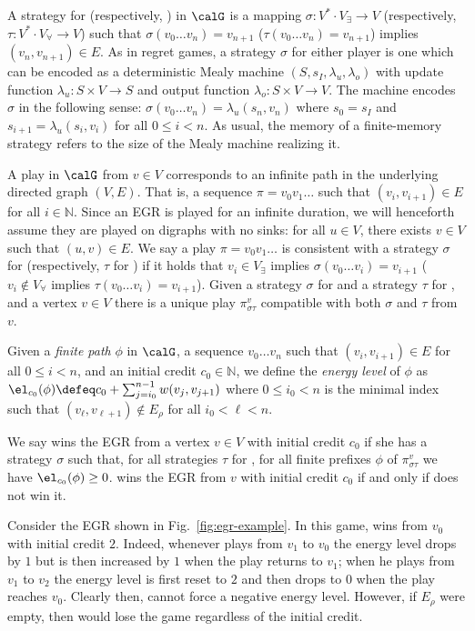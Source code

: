 \documentclass[a4paper]{article}
\begin{document}
A strategy for \eve (respectively, \adam) in $\calG$ is a mapping $\sigma :
V^* \cdot V_\exists \to V$ (respectively, $\tau : V^* \cdot V_\forall \to V$)
such that $\sigma(v_0 \dots v_n) = v_{n+1}$ ($\tau(v_0 \dots v_n) = v_{n+1}$)
implies $(v_n, v_{n+1}) \in E$. As in regret games, a strategy $\sigma$ for
either player is one which can be encoded as a deterministic Mealy machine
$(S,s_I,\lambda_u,\lambda_o)$ with update function $\lambda_u : S \times V \to S$
and output function $\lambda_o : S \times V \to V$. The machine encodes $\sigma$
in the following sense: $\sigma(v_0 \dots v_n) = \lambda_u(s_n,v_{n})$ where $s_0
= s_I$ and $s_{i+1} = \lambda_u(s_i,v_i)$ for all $0 \le i < n$. As usual,
the memory of a finite-memory strategy refers to the size of the
Mealy machine realizing it.

A play in $\calG$ from $v \in V$ corresponds to an infinite
path in the underlying directed graph $(V,E)$. That is, a sequence $\pi = v_0
v_1 \dots$ such that $(v_i,v_{i+1}) \in E$ for all $i \in \mathbb{N}$. Since an
EGR is played for an infinite duration,
we will henceforth assume they are
played on digraphs with no sinks: \ie for all $u \in V$, there exists $v \in V$
such that $(u,v) \in E$.
%
We say a play $\pi = v_0 v_1 \dots$ is consistent with a strategy $\sigma$ for
\eve (respectively, $\tau$ for \adam) if it holds that $v_i \in V_\exists$
implies $\sigma(v_0 \dots v_i) = v_{i+1}$ ($v_i \not\in V_\forall$ implies
$\tau(v_0 \dots v_i) = v_{i+1}$).  Given a strategy $\sigma$ for \eve and a
strategy $\tau$ for \adam, and a vertex $v \in V$ there is a unique play
$\pi^v_{\sigma \tau}$ compatible with both $\sigma$ and $\tau$ from $v$.

Given a \emph{finite path} $\phi$ in $\calG$, \ie a sequence $v_0 \dots v_n$
such that $(v_i,v_{i+1}) \in E$ for all $0 \le i < n$, and an initial credit
$c_0 \in \mathbb{N}$, we define the \emph{energy level} of $\phi$ as
$\el_{c_0}(\phi) \defeq c_0 + \sum^{n-1}_{j = i_0} w(v_j,v_{j+1})$ where $0 \le
i_0 < n$ is the minimal index such that $(v_{\ell},v_{\ell + 1}) \not\in E_\rho$
for all $i_0 < \ell < n$.

We say \eve wins the EGR from a vertex $v \in V$ with initial credit $c_0$ if
she has a strategy $\sigma$ such that, for all strategies $\tau$ for \adam, for
all finite prefixes $\phi$ of $\pi^v_{\sigma \tau}$ we have $\el_{c_0}(\phi) \ge
0$. \adam wins the EGR from $v$ with initial credit $c_0$ 
if and only if \eve does not win it.

\begin{example}
	Consider the EGR shown in Fig.~\ref{fig:egr-example}. In this game,
	\eve wins from $v_0$ with initial credit $2$. Indeed, whenever
	\adam plays from $v_1$ to $v_0$ the energy level drops by $1$ but is
	then increased by $1$ when the play returns to $v_1$; when he
	plays from $v_1$ to $v_2$ the energy level is first reset to $2$ and
	then drops to $0$ when the play reaches $v_0$. Clearly then, \adam
	cannot force a negative energy level. However, if $E_\rho$ were empty,
	then \eve would lose the game regardless of the initial credit.
\end{example}
\end{document}
